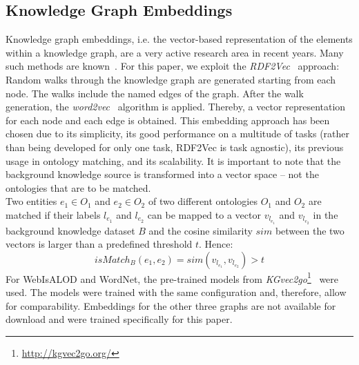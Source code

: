 \documentclass[runningheads]{llncs}
\begin{document}
\subsection{Knowledge Graph Embeddings}
\label{ssec:kge_strategy}
Knowledge graph embeddings, i.e. the vector-based representation of the elements within a knowledge graph, are a very active research area in recent years. Many such methods are known~\cite{DBLP:journals/corr/abs-1905-11485}. For this paper, we exploit the \textit{RDF2Vec}~\cite{rdf2vec_journal} approach: Random walks through the knowledge graph are generated starting from each node. The walks include the named edges of the graph. After the walk generation, the \textit{word2vec}~\cite{word_2_vec_2} algorithm is applied. Thereby, a vector representation for each node and each edge is obtained. This embedding approach has been chosen due to its simplicity, its good performance on a multitude of tasks (rather than being developed for only one task, RDF2Vec is task agnostic), its previous usage in ontology matching, and its scalability. It is important to note that the background knowledge source is transformed into a vector space -- not the ontologies that are to be matched.\\
Two entities $e_1 \in O_1$ and $e_2 \in O_2$ of two different ontologies $O_1$ and $O_2$ are matched if their labels $l_{e_1}$ and $l_{e_2}$ can be mapped to a vector $v_{l_{e_1}}$ and $v_{l_{e_2}}$ in the background knowledge dataset $B$ and the cosine similarity $sim$ between the two vectors is larger than a predefined threshold $t$. Hence: 
\begin{equation}
    isMatch_B(e_1, e_2) = sim(v_{l_{e_1}}, v_{l_{e_2}}) > t
\end{equation}
For WebIsALOD and WordNet, the pre-trained models from \textit{KGvec2go}\footnote{\url{http://kgvec2go.org/}}~\cite{kgvec2go} were used. The models were trained with the same configuration and, therefore, allow for comparability. Embeddings for the other three graphs are not available for download and were trained specifically for this paper.
\end{document}
